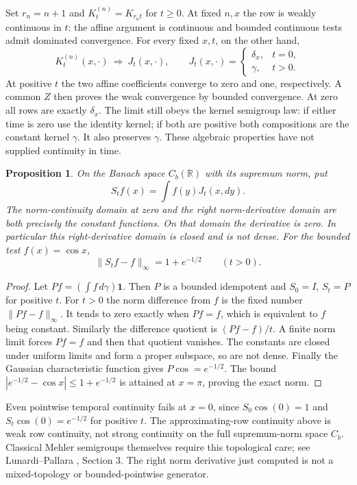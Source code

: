 \documentclass[11pt]{article}
\newtheorem{proposition}[theorem]{Proposition}
\newcommand{\R}{\mathbb R}\newcommand{\E}{\mathbb E}
\begin{document}
Set $r_n=n+1$ and $K_t^{(n)}=K_{r_nt}$ for $t\geq0$.
At fixed $n,x$ the row is weakly continuous in $t$: the affine
argument is continuous and bounded continuous tests admit dominated
convergence. For every fixed $x,t$, on the other hand,
\begin{equation}\label{eq:refreshlimit}
 K_t^{(n)}(x,\cdot)\ \Longrightarrow\ J_t(x,\cdot),\qquad
 J_t(x,\cdot)=\begin{cases}\delta_x,&t=0,\\\gamma,&t>0.\end{cases}
\end{equation}
At positive $t$ the two affine coefficients converge to zero and one,
respectively. A common $Z$ then proves the weak convergence by
bounded convergence. At zero all rows are exactly $\delta_x$.
The limit still obeys the kernel semigroup law: if either time is
zero use the identity kernel; if both are positive both compositions
are the constant kernel $\gamma$. It also preserves $\gamma$.
These algebraic properties have not supplied continuity in time.

\begin{proposition}\label{prop:refreshgenerator}
On the Banach space $C_b(\R)$ with its supremum norm, put
\[S_tf(x)=\int f(y)J_t(x,dy).\]
The norm-continuity domain at zero and
the right norm-derivative domain are both precisely the constant
functions. On that domain the derivative is zero. In particular
this right-derivative domain is closed and is not dense.
For the bounded test $f(x)=\cos x$,
\[
 \|S_tf-f\|_\infty=1+e^{-1/2}\qquad(t>0).
\]
\end{proposition}
\begin{proof}
Let $Pf=(\int f\,d\gamma)\mathbf1$. Then $P$ is a bounded
idempotent and $S_0=I$, $S_t=P$ for positive $t$.
For $t>0$ the norm difference from $f$ is the fixed number
$\|Pf-f\|_\infty$. It tends to zero exactly when $Pf=f$,
which is equivalent to $f$ being constant. Similarly the difference
quotient is $(Pf-f)/t$. A finite norm limit forces $Pf=f$ and
then that quotient vanishes. The constants are closed under uniform
limits and form a proper subspace, so are not dense. Finally the
Gaussian characteristic function gives $P\cos=e^{-1/2}$.
The bound $|e^{-1/2}-\cos x|\leq1+e^{-1/2}$ is attained at
$x=\pi$, proving the exact norm.
\end{proof}
Even pointwise temporal continuity fails at $x=0$, since
$S_0\cos(0)=1$ and $S_t\cos(0)=e^{-1/2}$ for positive $t$.
The approximating-row continuity above is weak row continuity,
not strong continuity on the full supremum-norm space $C_b$.
Classical Mehler semigroups themselves require this topological
care; see Lunardi--Pallara \cite{LunardiPallara}, Section 3.
The right norm derivative just computed is not a mixed-topology
or bounded-pointwise generator.
\end{document}
